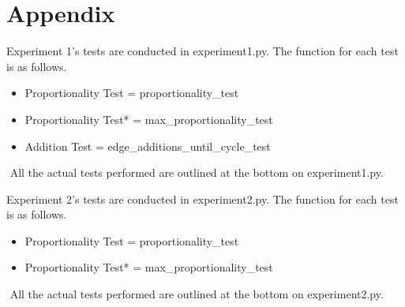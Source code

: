 \documentclass[12pt]{article}
\begin{document}
%
%
%
%
\newpage
\section{Appendix}

Experiment 1's tests are conducted in experiment1.py.
The function for each test is as follows.
\begin{itemize}
    \item Proportionality Test = proportionality\_test\(\)
    \item Proportionality Test* = max\_proportionality\_test\(\)
    \item Addition Test = edge\_additions\_until\_cycle\_test\(\)
\end{itemize}
$ $
\newline
All the actual tests performed are outlined at the bottom on experiment1.py.
\newline
$ $
\newline

Experiment 2's tests are conducted in experiment2.py.
The function for each test is as follows.
\begin{itemize}
    \item Proportionality Test = proportionality\_test\(\)
    \item Proportionality Test* = max\_proportionality\_test\(\)
\end{itemize}
$ $
\newline
All the actual tests performed are outlined at the bottom on experiment2.py.



\end{document}
